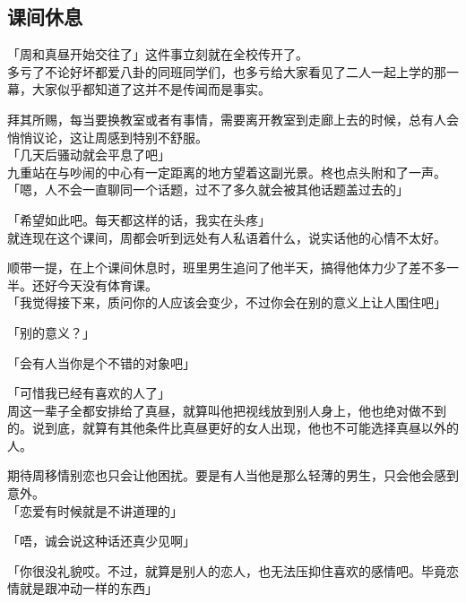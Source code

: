 \subsection{课间休息}

「周和真昼开始交往了」这件事立刻就在全校传开了。\\

多亏了不论好坏都爱八卦的同班同学们，也多亏给大家看见了二人一起上学的那一幕，大家似乎都知道了这并不是传闻而是事实。

拜其所赐，每当要换教室或者有事情，需要离开教室到走廊上去的时候，总有人会悄悄议论，这让周感到特别不舒服。\\

「几天后骚动就会平息了吧」\\

九重站在与吵闹的中心有一定距离的地方望着这副光景。柊也点头附和了一声。\\

「嗯，人不会一直聊同一个话题，过不了多久就会被其他话题盖过去的」

「希望如此吧。每天都这样的话，我实在头疼」\\

就连现在这个课间，周都会听到远处有人私语着什么，说实话他的心情不太好。

顺带一提，在上个课间休息时，班里男生追问了他半天，搞得他体力少了差不多一半。还好今天没有体育课。\\

「我觉得接下来，质问你的人应该会变少，不过你会在别的意义上让人围住吧」

「别的意义？」

「会有人当你是个不错的对象吧」

「可惜我已经有喜欢的人了」\\

周这一辈子全都安排给了真昼，就算叫他把视线放到别人身上，他也绝对做不到的。说到底，就算有其他条件比真昼更好的女人出现，他也不可能选择真昼以外的人。

期待周移情别恋也只会让他困扰。要是有人当他是那么轻薄的男生，只会他会感到意外。\\%

「恋爱有时候就是不讲道理的」

「唔，诚会说这种话还真少见啊」

「你很没礼貌哎。不过，就算是别人的恋人，也无法压抑住喜欢的感情吧。毕竟恋情就是跟冲动一样的东西」\\

